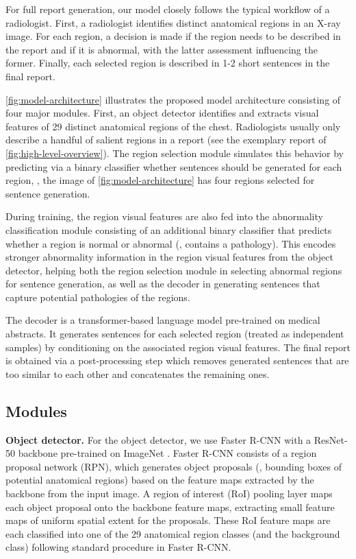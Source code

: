 \documentclass[10pt,twocolumn,letterpaper]{article}
\begin{document}
For full report generation, our model closely follows the typical workflow of a radiologist. First, a radiologist identifies distinct anatomical regions in an X-ray image. For each region, a decision is made if the region needs to be described in the report and if it is abnormal, with the latter assessment influencing the former. Finally, each selected region is described in 1-2 short sentences in the final report.

\cref{fig:model-architecture} illustrates the proposed model architecture consisting of four major modules. First, an object detector identifies and extracts visual features of 29 distinct anatomical regions of the chest. Radiologists usually only describe a handful of salient regions in a report (see the exemplary report of \cref{fig:high-level-overview}). The region selection module simulates this behavior by predicting via a binary classifier whether sentences should be generated for each region, \eg, the image of \cref{fig:model-architecture} has four regions selected for sentence generation.

During training, the region visual features are also fed into the abnormality classification module consisting of an additional binary classifier that predicts whether a region is normal or abnormal (\ie, contains a pathology). This encodes stronger abnormality information in the region visual features from the object detector, helping both the region selection module in selecting abnormal regions for sentence generation, as well as the decoder in generating sentences that capture potential pathologies of the regions.

The decoder is a transformer-based language model pre-trained on medical abstracts. It generates sentences for each selected region (treated as independent samples) by conditioning on the associated region visual features. The final report is obtained via a post-processing step which removes generated sentences that are too similar to each other and concatenates the remaining ones.

\subsection{Modules}
\label{sec:modules}

\noindent\textbf{Object detector.} For the object detector, we use Faster R-CNN \cite{ren2015faster} with a ResNet-50 \cite{he2016deep} backbone pre-trained on ImageNet \cite{deng2009imagenet}. Faster R-CNN consists of a region proposal network (RPN), which generates object proposals (\ie, bounding boxes of potential anatomical regions) based on the feature maps extracted by the backbone from the input image. A region of interest (RoI) pooling layer maps each object proposal onto the backbone feature maps, extracting small feature maps of uniform spatial extent for the proposals. These RoI feature maps are each classified into one of the 29 anatomical region classes (and the background class) following standard procedure in Faster R-CNN.
\end{document}
